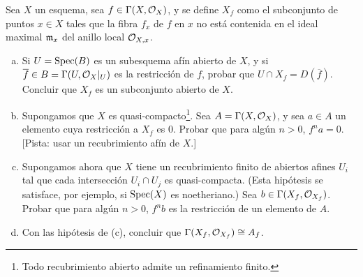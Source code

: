 \documentclass[twoside]{article}
\begin{document}
%
%
%
%
%
%
%
%
%
%
%
%
\begin{ejercicio}{2.16}
Sea $X$ un esquema, sea $f\in\Gamma(X,{\mathcal O}_X)$, y se define $X_f$ como el subconjunto de puntos $x\in X$ tales que la fibra $f_x$ de $f$ en $x$ no está contenida en el ideal maximal $\mathfrak{m}_x$ del anillo local ${\mathcal O}_{X,x}$. 
\begin{enumerate}[(a)]
\item Si $U=\operatorname{Spec}(B)$ es un subesquema afín abierto de $X$, y si $\overline{f}\in B=\Gamma(U,{\mathcal O}_X|_U)$ es la restricción de $f$, probar que $U\cap X_f=D(\overline{f})$. Concluir que $X_f$ es un subconjunto abierto de $X$. 
\item Supongamos que $X$ es quasi-compacto\footnote{Todo recubrimiento abierto admite un refinamiento finito.}. Sea $A=\Gamma(X,{\mathcal O}_X)$, y sea $a\in A$ un elemento cuya restricción a $X_f$ es 0. Probar que para algún $n>0$, $f^na=0$. [Pista: usar un recubrimiento afín de $X$.]
\item Supongamos ahora que $X$ tiene un recubrimiento finito de abiertos afines $U_i$ tal que cada intersección $U_i\cap U_j$ es quasi-compacta. (Esta hipótesis se satisface, por ejemplo, si $\operatorname{Spec}(X)$ es noetheriano.) Sea $b\in\Gamma(X_f,{\mathcal O}_{X_f})$. Probar que para algún $n>0$, $f^nb$ es la restricción de un elemento de $A$.
\item Con las hipótesis de (c), concluir que $\Gamma(X_f,{\mathcal O}_{X_f})\cong A_f$.
\end{enumerate}
\end{ejercicio}
\end{document}
